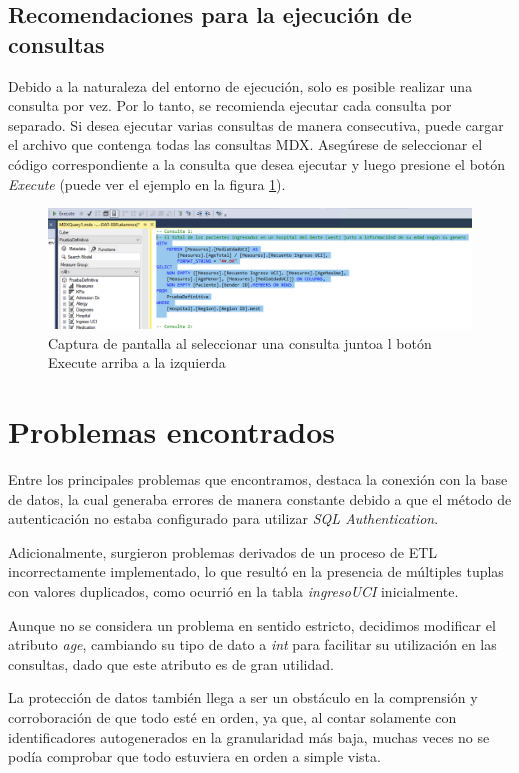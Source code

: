 \documentclass[12pt, a4paper, twoside]{article}
\begin{document}
	\subsection{Recomendaciones para la ejecución de consultas}
	Debido a la naturaleza del entorno de ejecución, solo es posible realizar una consulta por vez. Por lo tanto, se recomienda ejecutar cada consulta por separado. Si desea ejecutar varias consultas de manera consecutiva, puede cargar el archivo que contenga todas las consultas MDX. Asegúrese de seleccionar el código correspondiente a la consulta que desea ejecutar y luego presione el botón \textit{Execute} (puede ver el ejemplo en la figura \ref{fig:final}).
	
	
	\begin{figure}[H]
		\centering
		\includegraphics[width=1\textwidth]{image/final.png}
		\caption{Captura de pantalla al seleccionar una consulta juntoa l botón Execute arriba a la izquierda}
		\label{fig:final}
	\end{figure}
		
	
	\section{Problemas encontrados}

	Entre los principales problemas que encontramos, destaca la conexión con la base de datos, la cual generaba errores de manera constante debido a que el método de autenticación no estaba configurado para utilizar \textit{SQL Authentication}.
	
	Adicionalmente, surgieron problemas derivados de un proceso de ETL incorrectamente implementado, lo que resultó en la presencia de múltiples tuplas con valores duplicados, como ocurrió en la tabla \textit{ingresoUCI} inicialmente.
	
	Aunque no se considera un problema en sentido estricto, decidimos modificar el atributo \textit{age}, cambiando su tipo de dato a \textit{int} para facilitar su utilización en las consultas, dado que este atributo es de gran utilidad.
	
	La protección de datos también llega a ser un obstáculo en la comprensión y corroboración de que todo esté en orden, ya que, al contar solamente con identificadores autogenerados en la granularidad más baja, muchas veces no se podía comprobar que todo estuviera en orden a simple vista.
	
\end{document}

